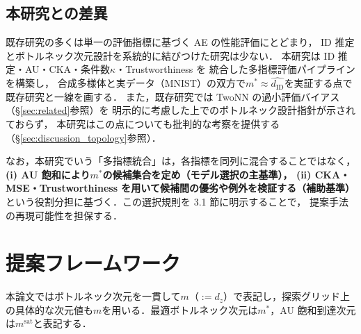 \documentclass[12pt,a4paper]{jsarticle}
\newcommand{\dID}{d_{\mathrm{ID}}}
\newcommand{\dzopt}{m^*}                    %
\newcommand{\kap}{\kappa}
\begin{document}
\subsection{本研究との差異}

既存研究の多くは単一の評価指標に基づく AE の性能評価にとどまり，
ID 推定とボトルネック次元設計を系統的に結びつけた研究は少ない．
本研究は ID 推定・AU・CKA・条件数$\kap$・Trustworthiness を
統合した多指標評価パイプラインを構築し，
合成多様体と実データ（MNIST）の双方で$\dzopt \approx \hat{\dID}$を実証する点で
既存研究と一線を画する．
また，既存研究では TwoNN の過小評価バイアス（§\ref{sec:related}参照）を
明示的に考慮した上でのボトルネック設計指針が示されておらず，
本研究はこの点についても批判的な考察を提供する（§\ref{sec:discussion_topology}参照）．

なお，本研究でいう「多指標統合」は，各指標を同列に混合することではなく，
\textbf{(i) AU 飽和により$\dzopt$の候補集合を定め（モデル選択の主基準），
(ii) CKA・MSE・Trustworthiness を用いて候補間の優劣や例外を検証する（補助基準）}
という役割分担に基づく．この選択規則を 3.1 節に明示することで，
提案手法の再現可能性を担保する．

\section{提案フレームワーク}\label{sec:framework}

本論文ではボトルネック次元を一貫して$m$（$:= d_z$）で表記し，探索グリッド上の具体的な次元値も$m$を用いる．最適ボトルネック次元は$m^*$，AU 飽和到達次元は$m^{\mathrm{sat}}$と表記する．
\end{document}
